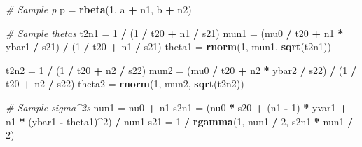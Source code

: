 \documentclass[]{article}
\newenvironment{Shaded}{\begin{snugshade}}{\end{snugshade}}
\newcommand{\CommentTok}[1]{\textcolor[rgb]{0.56,0.35,0.01}{\textit{#1}}}
\newcommand{\DecValTok}[1]{\textcolor[rgb]{0.00,0.00,0.81}{#1}}
\newcommand{\KeywordTok}[1]{\textcolor[rgb]{0.13,0.29,0.53}{\textbf{#1}}}
\newcommand{\NormalTok}[1]{#1}
\newcommand{\OperatorTok}[1]{\textcolor[rgb]{0.81,0.36,0.00}{\textbf{#1}}}
\newcommand{\StringTok}[1]{\textcolor[rgb]{0.31,0.60,0.02}{#1}}
\begin{document}
\begin{Shaded}
\begin{Highlighting}[]
  \CommentTok{# Sample p}
\NormalTok{  p =}\StringTok{ }\KeywordTok{rbeta}\NormalTok{(}\DecValTok{1}\NormalTok{, a }\OperatorTok{+}\StringTok{ }\NormalTok{n1, b }\OperatorTok{+}\StringTok{ }\NormalTok{n2)}
  
  \CommentTok{# Sample thetas}
\NormalTok{  t2n1 =}\StringTok{ }\DecValTok{1} \OperatorTok{/}\StringTok{ }\NormalTok{(}\DecValTok{1} \OperatorTok{/}\StringTok{ }\NormalTok{t20 }\OperatorTok{+}\StringTok{ }\NormalTok{n1 }\OperatorTok{/}\StringTok{ }\NormalTok{s21)}
\NormalTok{  mun1 =}\StringTok{ }\NormalTok{(mu0 }\OperatorTok{/}\StringTok{ }\NormalTok{t20 }\OperatorTok{+}\StringTok{ }\NormalTok{n1 }\OperatorTok{*}\StringTok{ }\NormalTok{ybar1 }\OperatorTok{/}\StringTok{ }\NormalTok{s21) }\OperatorTok{/}\StringTok{ }\NormalTok{(}\DecValTok{1} \OperatorTok{/}\StringTok{ }\NormalTok{t20 }\OperatorTok{+}\StringTok{ }\NormalTok{n1 }\OperatorTok{/}\StringTok{ }\NormalTok{s21)}
\NormalTok{  theta1 =}\StringTok{ }\KeywordTok{rnorm}\NormalTok{(}\DecValTok{1}\NormalTok{, mun1, }\KeywordTok{sqrt}\NormalTok{(t2n1))}
  
\NormalTok{  t2n2 =}\StringTok{ }\DecValTok{1} \OperatorTok{/}\StringTok{ }\NormalTok{(}\DecValTok{1} \OperatorTok{/}\StringTok{ }\NormalTok{t20 }\OperatorTok{+}\StringTok{ }\NormalTok{n2 }\OperatorTok{/}\StringTok{ }\NormalTok{s22)}
\NormalTok{  mun2 =}\StringTok{ }\NormalTok{(mu0 }\OperatorTok{/}\StringTok{ }\NormalTok{t20 }\OperatorTok{+}\StringTok{ }\NormalTok{n2 }\OperatorTok{*}\StringTok{ }\NormalTok{ybar2 }\OperatorTok{/}\StringTok{ }\NormalTok{s22) }\OperatorTok{/}\StringTok{ }\NormalTok{(}\DecValTok{1} \OperatorTok{/}\StringTok{ }\NormalTok{t20 }\OperatorTok{+}\StringTok{ }\NormalTok{n2 }\OperatorTok{/}\StringTok{ }\NormalTok{s22)}
\NormalTok{  theta2 =}\StringTok{ }\KeywordTok{rnorm}\NormalTok{(}\DecValTok{1}\NormalTok{, mun2, }\KeywordTok{sqrt}\NormalTok{(t2n2))}

  \CommentTok{# Sample sigma^2s}
\NormalTok{  nun1 =}\StringTok{ }\NormalTok{nu0 }\OperatorTok{+}\StringTok{ }\NormalTok{n1}
\NormalTok{  s2n1 =}\StringTok{ }\NormalTok{(nu0 }\OperatorTok{*}\StringTok{ }\NormalTok{s20 }\OperatorTok{+}\StringTok{ }\NormalTok{(n1 }\OperatorTok{-}\StringTok{ }\DecValTok{1}\NormalTok{) }\OperatorTok{*}\StringTok{ }\NormalTok{yvar1 }\OperatorTok{+}\StringTok{ }\NormalTok{n1 }\OperatorTok{*}\StringTok{ }\NormalTok{(ybar1 }\OperatorTok{-}\StringTok{ }\NormalTok{theta1)}\OperatorTok{^}\DecValTok{2}\NormalTok{) }\OperatorTok{/}\StringTok{ }\NormalTok{nun1}
\NormalTok{  s21 =}\StringTok{ }\DecValTok{1} \OperatorTok{/}\StringTok{ }\KeywordTok{rgamma}\NormalTok{(}\DecValTok{1}\NormalTok{, nun1 }\OperatorTok{/}\StringTok{ }\DecValTok{2}\NormalTok{, s2n1 }\OperatorTok{*}\StringTok{ }\NormalTok{nun1 }\OperatorTok{/}\StringTok{ }\DecValTok{2}\NormalTok{)}


\end{Highlighting}
\end{Shaded}
\end{document}
